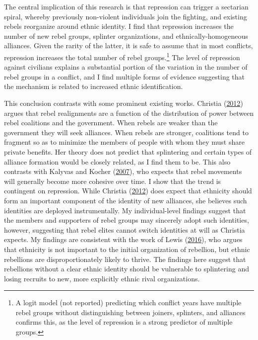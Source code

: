 \documentclass[12pt,]{book}
\let\rmarkdownfootnote\footnote%
\def\footnote{\protect\rmarkdownfootnote}
\theoremstyle{definition}
\theoremstyle{definition}
\theoremstyle{remark}
\begin{document}
The central implication of this research is that repression can trigger
a sectarian spiral, whereby previously non-violent individuals join the
fighting, and existing rebels reorganize around ethnic identity. I find
that repression increases the number of new rebel groups, splinter
organizations, and ethnically-homogeneous alliances. Given the rarity of
the latter, it is safe to assume that in most conflicts, repression
increases the total number of rebel groups.\footnote{A logit model (not
  reported) predicting which conflict years have multiple rebel groups
  without distinguishing between joiners, splinters, and alliances
  confirms this, as the level of repression is a strong predictor of
  multiple groups.} The level of repression against civilians explains a
substantial portion of the variation in the number of rebel groups in a
conflict, and I find multiple forms of evidence suggesting that the
mechanism is related to increased ethnic identification.

This conclusion contrasts with some prominent existing works. Christia
(\protect\hyperlink{ref-Christia2012}{2012}) argues that rebel
realignments are a function of the distribution of power between rebel
coalitions and the government. When rebels are weaker than the
government they will seek alliances. When rebels are stronger,
coalitions tend to fragment so as to minimize the members of people with
whom they must share private benefits. Her theory does not predict that
splintering and certain types of alliance formation would be closely
related, as I find them to be. This also contrasts with Kalyvas and
Kocher (\protect\hyperlink{ref-Kalyvas2007}{2007}), who expects that
rebel movements will generally become more cohesive over time. I show
that the trend is contingent on repression. While Christia
(\protect\hyperlink{ref-Christia2012}{2012}) does expect that ethnicity
should form an important component of the identity of new alliances, she
believes such identities are deployed instrumentally. My
individual-level findings suggest that the members and supporters of
rebel groups may sincerely adopt such identities, however, suggesting
that rebel elites cannot switch identities at will as Christia expects.
My findings are consistent with the work of Lewis
(\protect\hyperlink{ref-Lewis2016}{2016}), who argues that ethnicity is
not important to the initial organization of rebellion, but ethnic
rebellions are disproportionately likely to thrive. The findings here
suggest that rebellions without a clear ethnic identity should be
vulnerable to splintering and losing recruits to new, more explicitly
ethnic rival organizations.
\end{document}
